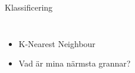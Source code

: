 \begin{frame}{Klassificering}
	\begin{columns}[T, onlytextwidth]
			\begin{itemize}
				\item K-Nearest Neighbour
				\item Vad är mina närmsta grannar?
			\end{itemize}
		
	\end{columns}
\end{frame}


